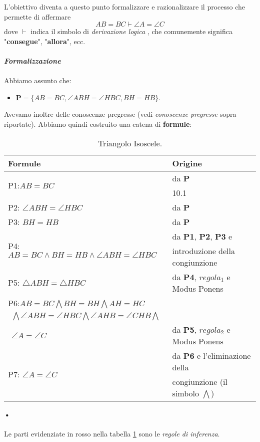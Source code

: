 \documentclass[11pt]{article}
\begin{document}
L'obiettivo diventa a questo punto formalizzare e razionalizzare il processo che permette di affermare $$ AB=BC\vdash\angle A = \angle C$$ dove $\vdash$ indica il simbolo di \color{red} \textit{derivazione logica} \color{black}, che comunemente significa "\textbf{consegue}", "\textbf{allora}", ecc.
\\ \\
\textit{\textbf{Formalizzazione}}
\\ \\
Abbiamo assunto che:
\begin{itemize}
\item $\textbf{P} = \{AB=BC, \angle ABH = \angle HBC, BH = HB\}$.
\end{itemize}
Avevamo inoltre delle conoscenze pregresse (vedi \textit{conoscenze pregresse} sopra riportate).
Abbiamo quindi costruito una catena di \textbf{formule}:
\begin{table}[h]
  \begin{center}
    \caption{Triangolo Isoscele.}
    \label{tab:isoscele}
    \begin{tabular}{l|l}
      \textbf{Formule} & \textbf{Origine} \\
      \hline
      \multirow{2}{*}{P1:$AB=BC$} 	& da \textbf{P} \\ %
      								& 10.1 \\ %
      \hline
      P2: $\angle ABH = \angle HBC$  & da \textbf{P} \\
      \hline
      P3: $BH = HB$ &  da \textbf{P}  \\
      \hline
      \multirow{2}{*}{P4:$AB = BC \wedge BH = HB \wedge \angle ABH = \angle HBC$ } 	& da \textbf{P1}, \textbf{P2}, \textbf{P3} e \\ %
      																				& \color{red} introduzione della congiunzione \color{black} \\
      \hline
      P5: $\bigtriangleup ABH = \bigtriangleup HBC$ & da \textbf{P4}, $regola_{1}$ e \color{red} Modus Ponens \color{black} \\ 
      \hline
      P6:$AB = BC \bigwedge BH = BH \bigwedge AH =HC $ \\ $\medspace \medspace \bigwedge \angle ABH = \angle HBC \bigwedge \angle AHB = \angle CHB \bigwedge $ \\ $\medspace \medspace  \angle A = \angle C$	& da \textbf{P5}, $regola_2$  e \color{red} Modus Ponens \color{black}  \\
      \hline
      \multirow{2}{*}{P7: $\angle A = \angle C$} & da \textbf{P6} e l'\color{red}eliminazione della \\ &\color{red} congiunzione\color{black} (il simbolo $\bigwedge$)
    \end{tabular}
  \end{center}
\end{table}\textbf{•}
\\ \\
Le parti evidenziate in rosso nella tabella \ref{tab:isoscele} sono le \emph{regole di inferenza}.
\end{document}
